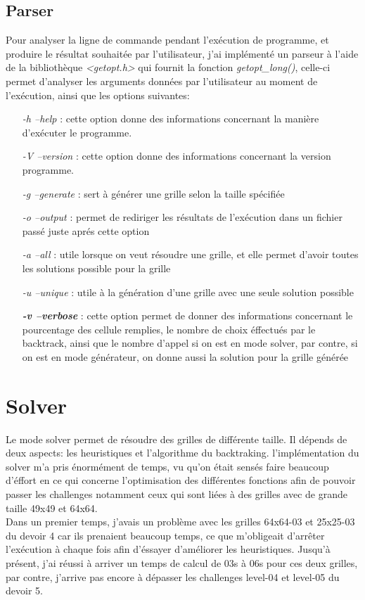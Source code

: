 \documentclass[12pt]{article}
\begin{document}
    \subsection{Parser}
     Pour analyser la ligne de commande pendant l'exécution de programme, et produire le résultat souhaitée par l'utilisateur, j'ai implémenté un parseur à l'aide de la bibliothèque \textit{<getopt.h>} qui fournit la fonction \textit{getopt\_long()}, celle-ci permet d'analyser les arguments données par l'utilisateur au moment de l'exécution, ainsi que les options suivantes:
     \begin{itemize}
		\item[\textit{-h --help}]: cette option donne des informations concernant la manière d'exécuter le programme.
        \item[\textit{-V --version}]: cette option donne des informations concernant la version programme.
        \item[\textit{-g --generate}]: sert à générer une grille selon la taille spécifiée
        \item[\textit{-o --output}]: permet de rediriger les résultats de l'exécution dans un fichier passé juste aprés cette option
        \item[\textit{-a --all}]: utile lorsque on veut résoudre une grille, et elle permet d'avoir toutes les solutions possible pour la grille
        \item[\textit{-u --unique}]: utile à la génération d'une grille avec une seule solution possible
        \item[\textit{\textbf{-v --verbose}}]: cette option permet de donner des informations concernant le pourcentage des cellule remplies, le nombre de choix éffectués par le backtrack, ainsi que le nombre d'appel si on est en mode solver, par contre, si on est en mode générateur, on donne aussi la solution pour la grille générée
	\end{itemize}

    \section{Solver}
    Le mode solver permet de résoudre des grilles de différente taille. Il dépends de deux aspects: les heuristiques et l'algorithme du backtraking. l'implémentation du solver m'a pris énormément de temps, vu qu'on était sensés faire beaucoup d'éffort en ce qui concerne l'optimisation des différentes fonctions afin de pouvoir passer les challenges notamment ceux qui sont liées à des grilles avec de grande taille 49x49 et 64x64.\\
    Dans un premier temps, j'avais un problème avec les grilles 64x64-03 et 25x25-03 du devoir 4 car ils prenaient beaucoup temps, ce que m'obligeait d'arrêter l'exécution à chaque fois afin d'éssayer d'améliorer les heuristiques. Jusqu'à présent, j'ai réussi à arriver un temps de calcul de 03s à 06s pour ces deux grilles, par contre, j'arrive pas encore à dépasser les challenges level-04 et level-05 du devoir 5. 
\end{document}
